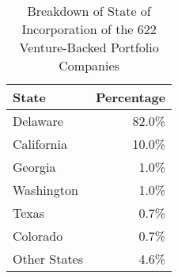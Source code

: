 
\begin{table}
    \centering

\caption{\label{tab:pcritable2} Breakdown of State of Incorporation of the 622 Venture-Backed Portfolio Companies}
\begin{tabular}[t]{lr}
\toprule
State & Percentage\\
\midrule
Delaware & 82.0\% \\ 
California & 10.0\% \\ 
Georgia & 1.0\% \\ 
Washington & 1.0\% \\
Texas & 0.7\% \\ 
Colorado & 0.7\% \\ 
Other States & 4.6\% \\ 
\bottomrule
\end{tabular}
\end{table}

